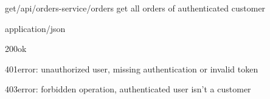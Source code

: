 \begin{apiRoute}{get}{/api/orders-service/orders} {get all orders of authenticated customer}
	\begin{routeParameter}
	\end{routeParameter}
	\begin{routeResponse}{application/json}
		\begin{routeResponseItem}{200}{ok}
			\begin{routeResponseItemBody}
			\end{routeResponseItemBody}
		\end{routeResponseItem}
	    \begin{routeResponseItem}{401}{error: unauthorized user, missing authentication or invalid token}
    	    \begin{routeResponseItemBody}
			\end{routeResponseItemBody}
		\end{routeResponseItem}
	    \begin{routeResponseItem}{403}{error: forbidden operation, authenticated user isn't a customer}
    	    \begin{routeResponseItemBody}
		    \end{routeResponseItemBody}
	    \end{routeResponseItem}	
	\end{routeResponse}
\end{apiRoute}

